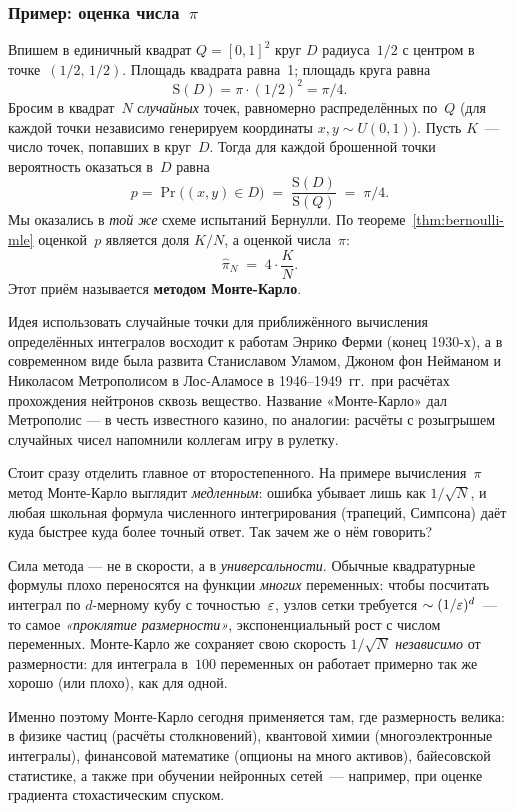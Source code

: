 \subsubsection*{Пример: оценка числа~$\pi$}

Впишем в единичный квадрат $Q=[0,1]^{2}$ круг $D$ радиуса~$1/2$ с центром
в точке~$(1/2,\,1/2)$. Площадь квадрата равна~1; площадь круга равна
\[
\mathrm{S}(D)=\pi\cdot (1/2)^{2}=\pi/4.
\]
Бросим в квадрат~$N$ \emph{случайных} точек, равномерно распределённых
по~$Q$ (для каждой точки независимо генерируем координаты $x,y\sim U(0,1)$).
Пусть $K$~--- число точек, попавших в круг~$D$. Тогда для каждой брошенной
точки вероятность оказаться в~$D$ равна
\[
p=\Pr\bigl((x,y)\in D\bigr)\;=\;\frac{\mathrm{S}(D)}{\mathrm{S}(Q)}\;=\;\pi/4.
\]
Мы оказались в \emph{той же} схеме испытаний Бернулли. По
теореме~\ref{thm:bernoulli-mle} оценкой~$p$ является доля $K/N$, а
оценкой числа~$\pi$:
\begin{equation}\label{eq:mc-pi}
\boxed{\;\hat\pi_N\;=\;4\cdot\frac{K}{N}.\;}
\end{equation}
Этот приём называется \textbf{методом Монте-Карло}.

\begin{historybox}
Идея использовать случайные точки для приближённого вычисления
определённых интегралов восходит к работам Энрико Ферми (конец 1930-х),
а в современном виде была развита Станиславом Уламом, Джоном фон
Нейманом и Николасом Метрополисом в Лос-Аламосе в 1946–1949~гг.\ при
расчётах прохождения нейтронов сквозь вещество. Название «Монте-Карло»
дал Метрополис — в честь известного казино, по аналогии: расчёты с
розыгрышем случайных чисел напомнили коллегам игру в рулетку.

Стоит сразу отделить главное от второстепенного. На примере вычисления~$\pi$
метод Монте-Карло выглядит \emph{медленным}: ошибка убывает лишь как
$1/\sqrt N$, и любая школьная формула численного интегрирования
(трапеций, Симпсона) даёт куда быстрее куда более точный ответ.
Так зачем же о нём говорить?

Сила метода --- не в скорости, а в \emph{универсальности}. Обычные
квадратурные формулы плохо переносятся на функции \emph{многих} переменных:
чтобы посчитать интеграл по $d$-мерному кубу с точностью~$\varepsilon$, узлов
сетки требуется $\sim (1/\varepsilon)^{d}$~--- то самое \emph{«проклятие
размерности»}, экспоненциальный рост с числом переменных. Монте-Карло же
сохраняет свою скорость $1/\sqrt N$ \emph{независимо} от размерности:
для интеграла в~$100$ переменных он работает примерно так же хорошо
(или плохо), как для одной.

Именно поэтому Монте-Карло сегодня применяется там, где размерность
велика: в физике частиц (расчёты столкновений), квантовой химии
(многоэлектронные интегралы), финансовой математике (опционы на
много активов), байесовской статистике, а также при обучении нейронных
сетей~--- например, при оценке градиента стохастическим спуском.
\end{historybox}

